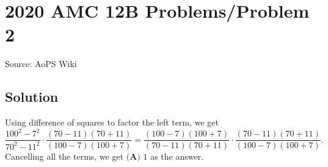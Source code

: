 \documentclass[12pt]{article}
\begin{document}
\section*{{2020 AMC 12B Problems/Problem 2}}
Source: AoPS Wiki

\subsection*{Solution}
Using difference of squares to factor the left term, we get \[\frac{100^2-7^2}{70^2-11^2} \cdot \frac{(70-11)(70+11)}{(100-7)(100+7)} = \frac{(100-7)(100+7)}{(70-11)(70+11)} \cdot \frac{(70-11)(70+11)}{(100-7)(100+7)}.\] Cancelling all the terms, we get $\boxed{\textbf{(A) } 1}$ as the answer.
\end{document}
